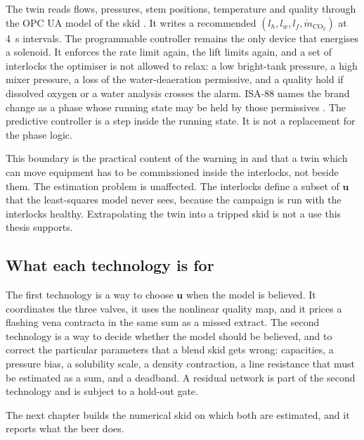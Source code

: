 The twin reads flows, pressures, stem positions, temperature and quality through the OPC UA model of the skid \citep{iec62541}. It writes a recommended $(l_h,l_w,l_f,\dot m_{\mathrm{CO_2}})$ at \SI{4}{\second} intervals. The programmable controller remains the only device that energises a solenoid. It enforces the rate limit again, the lift limits again, and a set of interlocks the optimiser is not allowed to relax: a low bright-tank pressure, a high mixer pressure, a loss of the water-deaeration permissive, and a quality hold if dissolved oxygen or a water analysis crosses the alarm. ISA-88 names the brand change as a phase whose running state may be held by those permissives \citep{isa88}. The predictive controller is a step inside the running state. It is not a replacement for the phase logic.

This boundary is the practical content of the warning in \citet{fuller2020} and \citet{goffi2025} that a twin which can move equipment has to be commissioned inside the interlocks, not beside them. The estimation problem is unaffected. The interlocks define a subset of $\mathbf{u}$ that the least-squares model never sees, because the campaign is run with the interlocks healthy. Extrapolating the twin into a tripped skid is not a use this thesis supports.



\subsection{What each technology is for}

The first technology is a way to choose $\mathbf{u}$ when the model is believed. It coordinates the three valves, it uses the nonlinear quality map, and it prices a flashing vena contracta in the same sum as a missed extract. The second technology is a way to decide whether the model should be believed, and to correct the particular parameters that a blend skid gets wrong: capacities, a pressure bias, a solubility scale, a density contraction, a line resistance that must be estimated as a sum, and a deadband. A residual network is part of the second technology and is subject to a hold-out gate.

The next chapter builds the numerical skid on which both are estimated, and it reports what the beer does.
